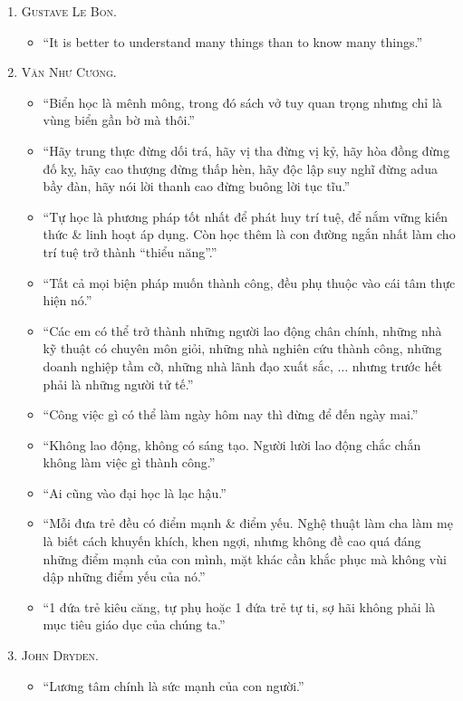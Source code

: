 \documentclass{article}
\numberwithin{equation}{section}
\begin{document}
\begin{enumerate}
	\item \textsc{Gustave Le Bon.}
	\begin{itemize}
		\item ``It is better to understand many things than to know many things.''
	\end{itemize}
	\item \textsc{Văn Như Cương.}
	\begin{itemize}
		\item ``Biển học là mênh mông, trong đó sách vở tuy quan trọng nhưng chỉ là vùng biển gần bờ mà thôi.''
		\item ``Hãy trung thực đừng dối trá, hãy vị tha đừng vị kỷ, hãy hòa đồng đừng đố kỵ, hãy cao thượng đừng thấp hèn, hãy độc lập suy nghĩ đừng adua bầy đàn, hãy nói lời thanh cao đừng buông lời tục tĩu.''
		\item ``Tự học là phương pháp tốt nhất để phát huy trí tuệ, để nắm vững kiến thức \& linh hoạt áp dụng. Còn học thêm là con đường ngắn nhất làm cho trí tuệ trở thành ``thiểu năng''.''
		\item ``Tất cả mọi biện pháp muốn thành công, đều phụ thuộc vào cái tâm thực hiện nó.''
		\item ``Các em có thể trở thành những người lao động chân chính, những nhà kỹ thuật có chuyên môn giỏi, những nhà nghiên cứu thành công, những doanh nghiệp tầm cỡ, những nhà lãnh đạo xuất sắc, $\ldots$ nhưng trước hết phải là những người tử tế.''
		\item ``Công việc gì có thể làm ngày hôm nay thì đừng để đến ngày mai.''
		\item ``Không lao động, không có sáng tạo. Người lười lao động chắc chắn không làm việc gì thành công.''
		\item ``Ai cũng vào đại học là lạc hậu.''
		\item ``Mỗi đưa trẻ đều có điểm mạnh \& điểm yếu. Nghệ thuật làm cha làm mẹ là biết cách khuyến khích, khen ngợi, nhưng không đề cao quá đáng những điểm mạnh của con mình, mặt khác cần khắc phục mà không vùi dập những điểm yếu của nó.''
		\item ``1 đứa trẻ kiêu căng, tự phụ hoặc 1 đứa trẻ tự ti, sợ hãi không phải là mục tiêu giáo dục của chúng ta.''
	\end{itemize}
	\item \textsc{John Dryden.}
	\begin{itemize}
		\item ``Lương tâm chính là sức mạnh của con người.''
	\end{itemize}

\end{enumerate}
\end{document}
